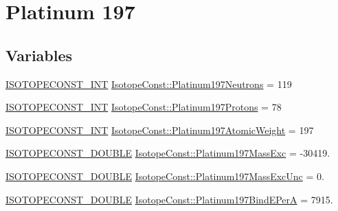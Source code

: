 \hypertarget{group___isotope_const-_platinum-_pt197}{}\section{Platinum 197}
\label{group___isotope_const-_platinum-_pt197}
\subsection*{Variables}
\begin{DoxyCompactItemize}
\item 
\mbox{\hyperlink{group___isotope_const-_macros_ga5f18360b3e99483a35c32d789e62621c}{I\+S\+O\+T\+O\+P\+E\+C\+O\+N\+S\+T\+\_\+\+I\+NT}} \mbox{\hyperlink{group___isotope_const-_platinum-_pt197_ga2d25b5518d9ecf786ec58cda41361e8d}{Isotope\+Const\+::\+Platinum197\+Neutrons}} = 119
\item 
\mbox{\hyperlink{group___isotope_const-_macros_ga5f18360b3e99483a35c32d789e62621c}{I\+S\+O\+T\+O\+P\+E\+C\+O\+N\+S\+T\+\_\+\+I\+NT}} \mbox{\hyperlink{group___isotope_const-_platinum-_pt197_ga7e0300b3970c8181729180d4b0cc88a6}{Isotope\+Const\+::\+Platinum197\+Protons}} = 78
\item 
\mbox{\hyperlink{group___isotope_const-_macros_ga5f18360b3e99483a35c32d789e62621c}{I\+S\+O\+T\+O\+P\+E\+C\+O\+N\+S\+T\+\_\+\+I\+NT}} \mbox{\hyperlink{group___isotope_const-_platinum-_pt197_gae1363ff92b03e2b027305d63623f9dd6}{Isotope\+Const\+::\+Platinum197\+Atomic\+Weight}} = 197
\item 
\mbox{\hyperlink{group___isotope_const-_macros_ga8f45a7272ce02c0b4c65c44636ed719a}{I\+S\+O\+T\+O\+P\+E\+C\+O\+N\+S\+T\+\_\+\+D\+O\+U\+B\+LE}} \mbox{\hyperlink{group___isotope_const-_platinum-_pt197_gabf6bb50d0c38ccd8b6951336a7babbfc}{Isotope\+Const\+::\+Platinum197\+Mass\+Exc}} = -\/30419.
\item 
\mbox{\hyperlink{group___isotope_const-_macros_ga8f45a7272ce02c0b4c65c44636ed719a}{I\+S\+O\+T\+O\+P\+E\+C\+O\+N\+S\+T\+\_\+\+D\+O\+U\+B\+LE}} \mbox{\hyperlink{group___isotope_const-_platinum-_pt197_ga9bf89d46e8f1bc086bb91ffa586fcb9d}{Isotope\+Const\+::\+Platinum197\+Mass\+Exc\+Unc}} = 0.
\item 
\mbox{\hyperlink{group___isotope_const-_macros_ga8f45a7272ce02c0b4c65c44636ed719a}{I\+S\+O\+T\+O\+P\+E\+C\+O\+N\+S\+T\+\_\+\+D\+O\+U\+B\+LE}} \mbox{\hyperlink{group___isotope_const-_platinum-_pt197_ga694fd145c82611eb9cf4d2004d5f9721}{Isotope\+Const\+::\+Platinum197\+Bind\+E\+PerA}} = 7915.
\item 

\end{DoxyCompactItemize}
